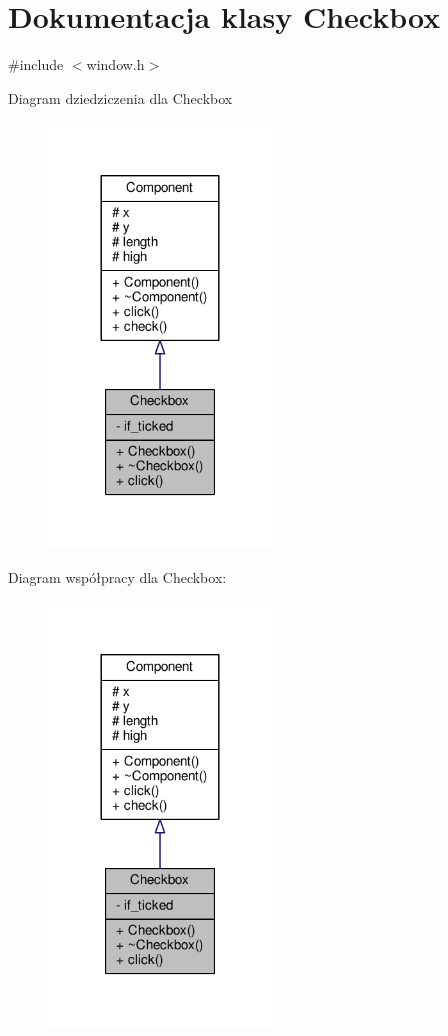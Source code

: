 \hypertarget{classCheckbox}{}\section{Dokumentacja klasy Checkbox}
\label{classCheckbox}


{\ttfamily \#include $<$window.\+h$>$}



Diagram dziedziczenia dla Checkbox\nopagebreak
\begin{figure}[H]
\begin{center}
\leavevmode
\includegraphics[width=168pt]{classCheckbox__inherit__graph}
\end{center}
\end{figure}


Diagram współpracy dla Checkbox\+:\nopagebreak
\begin{figure}[H]
\begin{center}
\leavevmode
\includegraphics[width=168pt]{classCheckbox__coll__graph}
\end{center}
\end{figure}
